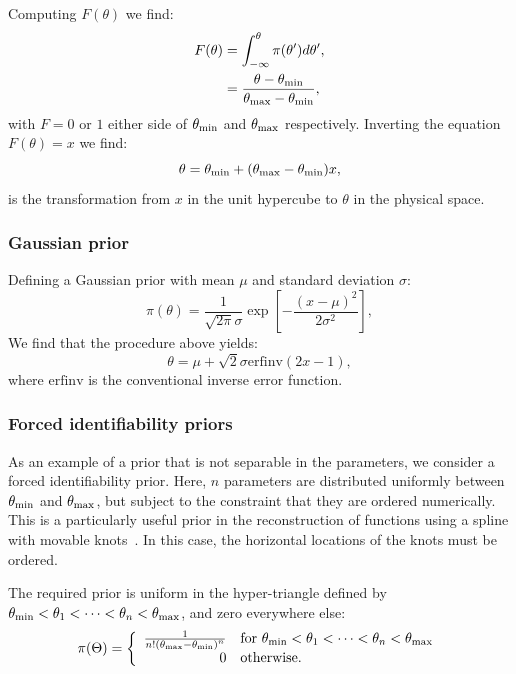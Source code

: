 Computing \(F(\theta)\) we find:
\begin{align}
  F(\theta) &= \int_{-\infty}^\theta \pi(\theta')d\theta', \nonumber\\
  &= \frac{\theta-\theta_{\mathrm{min}}}{\theta_{\mathrm{max}}-\theta_{\mathrm{min}}},
  \label{eqn:pc:calc_uniform_trans}
\end{align}
with \(F=0\) or \(1\) either side of \(\theta_{\mathrm{min}}\) and \(\theta_{\mathrm{max}}\) respectively. Inverting the equation \(F(\theta)=x\) we find:
\begin{equation}
  \theta = \theta_{\mathrm{min}}+(\theta_{\mathrm{max}}-\theta_{\mathrm{min}})x,
  \label{eqn:pc:uniform_trans}                           
\end{equation}
is the transformation from \(x\) in the unit hypercube to \(\theta\) in the physical space.

\subsubsection{Gaussian prior}
\label{sec:pc:gaussian_prior}
Defining a Gaussian prior with mean \(\mu\) and standard deviation \(\sigma\):
\begin{equation}
  \pi(\theta) = \frac{1}{\sqrt{2\pi}\sigma}\exp{\left[-\frac{{(x-\mu)}^2}{2\sigma^2}\right]},
  \label{eqn:pc:gaussian_prior}
\end{equation}
We find that the procedure above yields:
\begin{equation}
  \theta = \mu + \sqrt{2}\sigma\text{erfinv}(2x-1),
  \label{eqn:pc:gaussian_trans}                           
\end{equation}
where \(\text{erfinv}\) is the conventional inverse error function.




\subsubsection{Forced identifiability priors}
\label{sec:pc:forced_identifiablility}

As an example of a prior that is not separable in the parameters, we consider a forced identifiability prior. Here, \(n\) parameters are distributed uniformly between \(\theta_{\mathrm{min}}\) and \(\theta_{\mathrm{max}}\), but subject to the constraint that they are ordered numerically. This is a particularly useful prior in the reconstruction of functions using a spline with movable knots~\citep{vazquez_knots,knottedsky1,knottedsky2,planck2015-a24}. In this case, the  horizontal locations of the knots must be ordered.

The required prior is uniform in the hyper-triangle defined by \(\theta_{\mathrm{min}}<\theta_1<\cdots<\theta_n<\theta_{\mathrm{max}}\), and zero everywhere else:
%
\begin{equation}
  \pi(\Theta) = 
  \left\{
    \begin{array}{rl}
      \frac{1}{n!{(\theta_{\mathrm{max}} - \theta_{\mathrm{min}})}^{n}} 
      &
      \text{for }\theta_{\mathrm{min}}<\theta_1<\cdots<\theta_n<\theta_{\mathrm{max}} \\
      0 &\text{otherwise.}
    \end{array}
    \right.
\label{eqn:pc:sorted_uniform_prior}
\end{equation}

